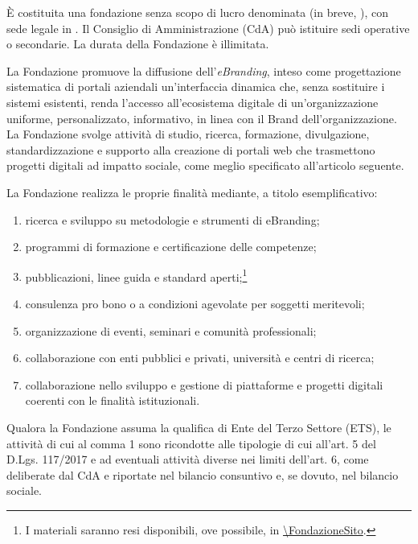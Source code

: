 \maketitle

 È costituita una fondazione senza scopo di lucro denominata  (in breve, \FondazioneSigla), con sede legale in . Il Consiglio di Amministrazione (CdA) può istituire sedi operative o secondarie.
 La durata della Fondazione è illimitata.

 La Fondazione promuove la diffusione dell'\emph{eBranding}, inteso come progettazione sistematica di portali aziendali un'interfaccia dinamica che, senza sostituire i sistemi esistenti, renda l'accesso all'ecosistema digitale di un'organizzazione uniforme, personalizzato, informativo, in linea con il Brand dell'organizzazione.
 La Fondazione svolge attività di studio, ricerca, formazione, divulgazione, standardizzazione e supporto alla creazione di portali web che trasmettono  progetti digitali ad impatto sociale, come meglio specificato all'articolo seguente.

 La Fondazione realizza le proprie finalità mediante, a titolo esemplificativo:
\FondazioneAttivita
\begin{enumerate}[label=\alph*)]
  \item ricerca e sviluppo su metodologie e strumenti di eBranding;
  \item programmi di formazione e certificazione delle competenze;
  \item pubblicazioni, linee guida e standard aperti;\footnote{I materiali saranno resi disponibili, ove possibile, in \url{\FondazioneSito}.}
  \item consulenza pro bono o a condizioni agevolate per soggetti meritevoli;
  \item organizzazione di eventi, seminari e comunità professionali;
  \item collaborazione con enti pubblici e privati, università e centri di ricerca;
  \item collaborazione nello sviluppo e gestione di piattaforme e progetti digitali coerenti con le finalità istituzionali.
\end{enumerate}
\ifETS
{} Qualora la Fondazione assuma la qualifica di Ente del Terzo Settore (ETS), le attività di cui al comma 1 sono ricondotte alle tipologie di cui all'art. 5 del D.Lgs. 117/2017 e ad eventuali attività diverse nei limiti dell'art. 6, come deliberate dal CdA e riportate nel bilancio consuntivo e, se dovuto, nel bilancio sociale.
\fi

